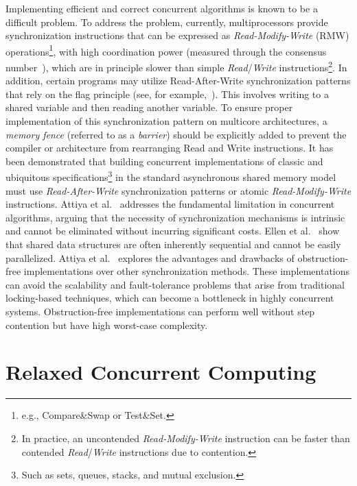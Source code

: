 Implementing efficient and correct concurrent algorithms is known to be a difficult problem.
To address the problem, currently, multiprocessors provide synchronization instructions that can be expressed as \textit{Read-Modify-Write} (RMW) operations\footnote{e.g., Compare\&Swap or Test\&Set.}, with high coordination power (measured through the consensus number~\cite{DBLP_journals_toplas_Herlihy91}), which are in principle slower than simple \textit{Read}/\textit{Write} instructions\footnote{In practice, an uncontended \textit{Read-Modify-Write} instruction can be faster than contended \textit{Read}/\textit{Write} instructions due to contention.}. In addition, certain programs may utilize Read-After-Write synchronization patterns that rely on the flag principle (see, for example,~\cite {DBLP_books_daglib_0020056}). This involves writing to a shared variable and then reading another variable. To ensure proper implementation of this synchronization pattern on multicore architectures, a \textit{memory fence} (referred to as a \textit{barrier}) should be explicitly added to prevent the compiler or architecture from rearranging Read and Write instructions. It has been demonstrated that building concurrent implementations of classic and ubiquitous specifications\footnote{Such as sets, queues, stacks, and mutual exclusion.} in the standard asynchronous shared memory model must use \textit{Read-After-Write} synchronization patterns or atomic \textit{Read-Modify-Write} instructions. Attiya et al.~\cite{DBLP_conf_popl_AttiyaGHKMV11} addresses the fundamental limitation in concurrent algorithms, arguing that the necessity of synchronization mechanisms is intrinsic and cannot be eliminated without incurring significant costs. Ellen et al.~\cite{DBLP_journals_siamcomp_EllenHS12} show that shared data structures are often inherently sequential and cannot be easily parallelized. Attiya et al.~\cite{DBLP_journals_jacm_AttiyaGHK09} explores the advantages and drawbacks of obstruction-free implementations over other synchronization methods. These implementations can avoid the scalability and fault-tolerance problems that arise from traditional locking-based techniques, which can become a bottleneck in highly concurrent systems. Obstruction-free implementations can perform well without step contention but have high worst-case complexity.

\section{\label{section:relaxed-concurrent}Relaxed Concurrent Computing}

